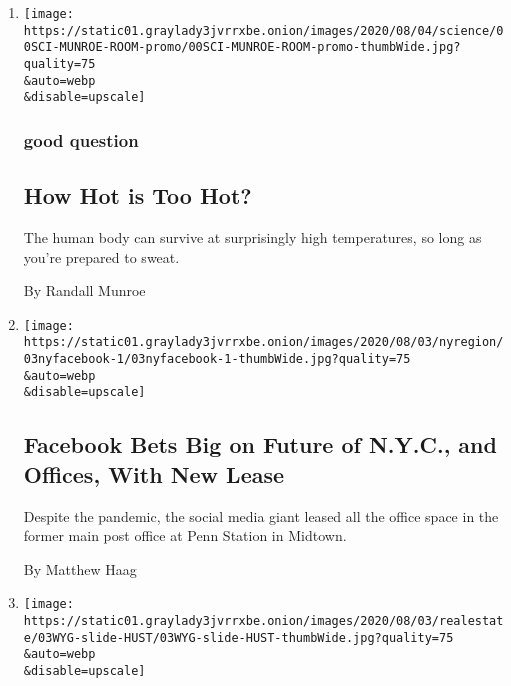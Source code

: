 \begin{enumerate}
\def\labelenumi{\arabic{enumi}.}
\item
  \href{/2020/08/04/science/randall-munroe-xkcd-temperature.html}{}

  \texttt{[image: https://static01.graylady3jvrrxbe.onion/images/2020/08/04/science/00SCI-MUNROE-ROOM-promo/00SCI-MUNROE-ROOM-promo-thumbWide.jpg?quality=75\\\&auto=webp\\\&disable=upscale]}

  \hypertarget{good-question}{%
  \subsubsection{good question}\label{good-question}}

  \hypertarget{how-hot-is-too-hot}{%
  \subsection{How Hot is Too Hot?}\label{how-hot-is-too-hot}}

  The human body can survive at surprisingly high temperatures, so long
  as you're prepared to sweat.

  By Randall Munroe
\item
  \href{/2020/08/03/nyregion/facebook-nyc-office-farley-building.html}{}

  \texttt{[image: https://static01.graylady3jvrrxbe.onion/images/2020/08/03/nyregion/03nyfacebook-1/03nyfacebook-1-thumbWide.jpg?quality=75\\\&auto=webp\\\&disable=upscale]}

  \hypertarget{facebook-bets-big-on-future-of-nyc-and-offices-with-new-lease}{%
  \subsection{Facebook Bets Big on Future of N.Y.C., and Offices, With
  New
  Lease}\label{facebook-bets-big-on-future-of-nyc-and-offices-with-new-lease}}

  Despite the pandemic, the social media giant leased all the office
  space in the former main post office at Penn Station in Midtown.

  By Matthew Haag
\item
  \href{/slideshow/2020/08/03/realestate/what-you-get-for-3-million-in-california.html}{}

  \texttt{[image: https://static01.graylady3jvrrxbe.onion/images/2020/08/03/realestate/03WYG-slide-HUST/03WYG-slide-HUST-thumbWide.jpg?quality=75\\\&auto=webp\\\&disable=upscale]}


\end{enumerate}

